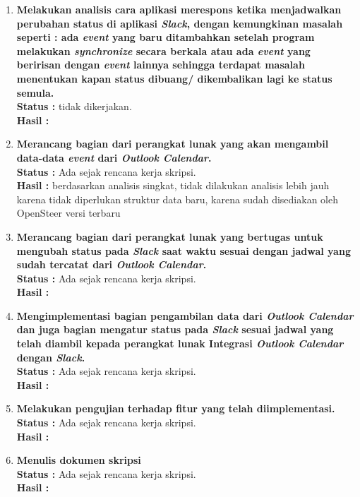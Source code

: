 \documentclass[a4paper,twoside]{article}
\begin{document}
\begin{enumerate}
		\item \textbf{Melakukan analisis cara aplikasi merespons ketika menjadwalkan perubahan status di aplikasi \textit{Slack}, dengan kemungkinan masalah seperti : ada \textit{event} yang baru ditambahkan setelah program melakukan \textit{synchronize} secara berkala atau ada \textit{event} yang beririsan dengan \textit{event} lainnya sehingga terdapat masalah menentukan kapan status dibuang/ dikembalikan lagi ke status semula.}\\
		{\bf Status :} tidak dikerjakan.\\
		{\bf Hasil :}

		\item \textbf{Merancang bagian dari perangkat lunak yang akan mengambil data-data \textit{event} dari \textit{Outlook Calendar}. }\\
		{\bf Status :} Ada sejak rencana kerja skripsi. \\
		{\bf Hasil :} berdasarkan analisis singkat, tidak dilakukan analisis lebih jauh karena tidak diperlukan struktur data baru, karena sudah disediakan oleh OpenSteer versi terbaru

		\item \textbf{Merancang bagian dari perangkat lunak yang bertugas untuk mengubah status pada \textit{Slack} saat waktu sesuai dengan jadwal yang sudah tercatat dari \textit{Outlook Calendar}.} \\
		{\bf Status :} Ada sejak rencana kerja skripsi.\\
		{\bf Hasil :}

		\item \textbf{Mengimplementasi bagian pengambilan data dari \textit{Outlook Calendar} dan juga bagian mengatur status pada \textit{Slack} sesuai jadwal yang telah diambil kepada perangkat lunak Integrasi \textit{Outlook Calendar} dengan \textit{Slack}.}\\
		{\bf Status :} Ada sejak rencana kerja skripsi.\\
		{\bf Hasil :}

		\item \textbf{Melakukan pengujian terhadap fitur yang telah diimplementasi.}\\
		{\bf Status :} Ada sejak rencana kerja skripsi.\\
		{\bf Hasil :} 
		
		\item \textbf{Menulis dokumen skripsi}\\
		{\bf Status :} Ada sejak rencana kerja skripsi.\\
		{\bf Hasil :} \lipsum[1]
		
	\end{enumerate}
\end{document}
